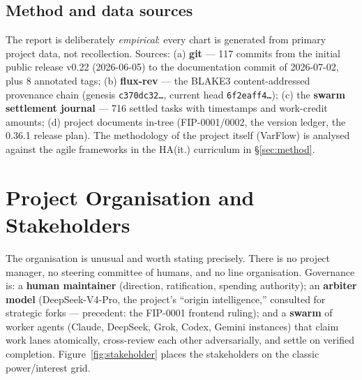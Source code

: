 \subsection{Method and data sources}

The report is deliberately \emph{empirical}: every chart is generated from primary project data, not recollection. Sources: (a) \textbf{git} --- 117 commits from the initial public release v0.22 (2026-06-05) to the documentation commit of 2026-07-02, plus 8 annotated tags; (b) \textbf{flux-rev} --- the BLAKE3 content-addressed provenance chain (genesis \texttt{c370dc32\ldots}, current head \texttt{6f2eaff4\ldots}); (c) the \textbf{swarm settlement journal} --- 716 settled tasks with timestamps and work-credit amounts; (d) project documents in-tree (FIP-0001/0002, the version ledger, the 0.36.1 release plan). The methodology of the project itself (VarFlow) is analysed against the agile frameworks in the HA(it.) curriculum in \S\ref{sec:method}.

\section{Project Organisation and Stakeholders}

The organisation is unusual and worth stating precisely. There is no project manager, no steering committee of humans, and no line organisation. Governance is: a \textbf{human maintainer} (direction, ratification, spending authority); an \textbf{arbiter model} (DeepSeek-V4-Pro, the project's ``origin intelligence,'' consulted for strategic forks --- precedent: the FIP-0001 frontend ruling); and a \textbf{swarm} of worker agents (Claude, DeepSeek, Grok, Codex, Gemini instances) that claim work lanes atomically, cross-review each other adversarially, and settle on verified completion. Figure~\ref{fig:stakeholder} places the stakeholders on the classic power/interest grid.

